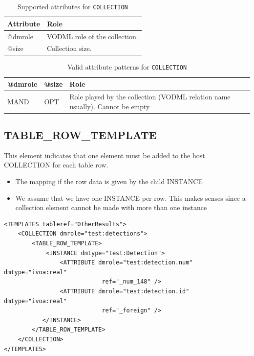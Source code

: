 \documentclass[11pt,a4paper]{ivoa}
\begin{document}
\begin{table}[hbtp]
\small
\centering
\begin{tabulary}{\linewidth}{|L|J|}
       \hline 
           \textbf{Attribute} & 
           \textbf{Role}\\
       \hline  
          @dmrole    & 
           VODML role of the collection.\\       
       \hline  
          @size    & 
          Collection size.\\       
       \hline 
 \end{tabulary}
 \caption{Supported attributes for  \texttt{COLLECTION}} 
 \label{tbl:att-att}
 \end{table}


\begin{table}[hbtp]
\small
\centering
\begin{tabulary}{\linewidth}{|L|L|J|}
    \hline 
        @dmrole   & 
        @size   &  
        Role\\
    \hline  
       MAND & 
       OPT & 
       Role played by the collection (VODML relation name usually). Cannot be empty \\    
    \hline 
  \end{tabulary}
  \caption{Valid attribute patterns for  \texttt{COLLECTION}} 
  \label{tbl:coll-pattern}
 \end{table}

%
%
\subsection{TABLE\_ROW\_TEMPLATE}
This element indicates that one element must be added to the host COLLECTION for each table row.

\begin{itemize}
    \item The mapping if the row data is given by the child INSTANCE
    \item We assume that we have one INSTANCE per row. 
             This makes senses since a collection element cannot be made with more than one instance
\end{itemize}

\begin{lstlisting}[caption={TABLE\_ROW\_TEMPLATE examples},style=XML]
<TEMPLATES tableref="OtherResults">
    <COLLECTION dmrole="test:detections">
        <TABLE_ROW_TEMPLATE>
            <INSTANCE dmtype="test:Detection">
                <ATTRIBUTE dmrole="test:detection.num" dmtype="ivoa:real"
                            ref="_num_148" />
                <ATTRIBUTE dmrole="test:detection.id" dmtype="ivoa:real"
                            ref="_foreign" />
           </INSTANCE>
        </TABLE_ROW_TEMPLATE>
    </COLLECTION>
</TEMPLATES>
\end{lstlisting}
\end{document}
